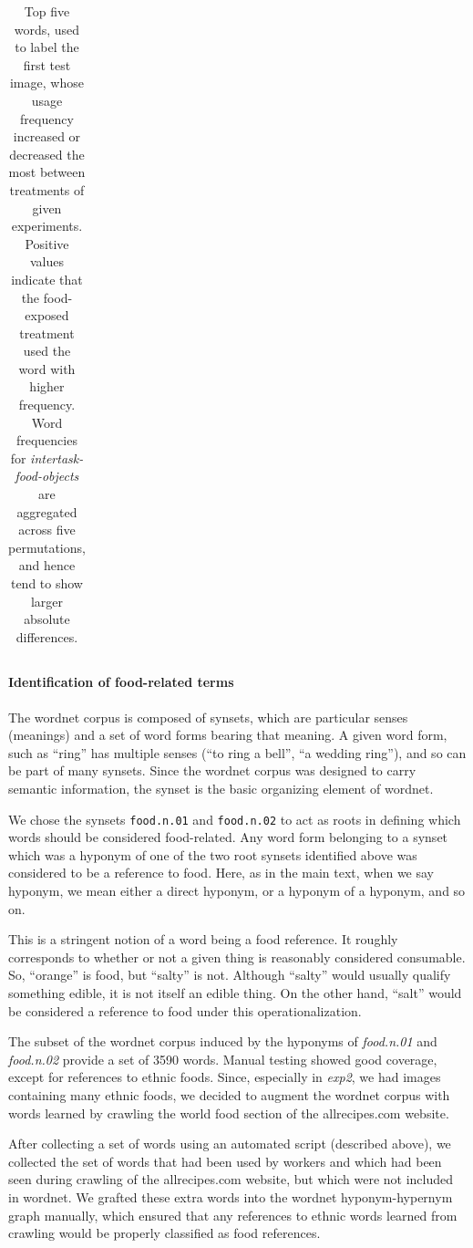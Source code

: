 \documentclass[12pt]{article}
\begin{document}
\begin{table}
\begin{tabular}{ c c c c c }
	\end{tabular}
	\caption{
		Top five words, used to label the first test image, whose usage frequency
		increased or decreased the most between treatments of given 
		experiments.  Positive values indicate that the food-exposed treatment
		used the word with higher frequency.  Word frequencies for 
		\textit{intertask-food-objects} are aggregated across five 
		permutations, and hence tend to show larger absolute differences.
	}
	\label{table:top-words}
\end{table}

\paragraph{Identification of food-related terms}
The wordnet corpus is composed of synsets, which are particular senses 
(meanings) and a set of word forms bearing that meaning. A given word form, 
such as ``ring'' has multiple senses (``to ring a bell'', ``a wedding ring''),
and so can be part of many synsets.  Since the wordnet corpus was designed
to carry semantic information, the synset is the basic organizing element
of wordnet.

We chose the synsets \texttt{food.n.01} and \texttt{food.n.02} to act as roots
in defining which words should be considered food-related.  Any word form
belonging to a synset which was a hyponym of one of the two root synsets
identified above was considered to be a reference to food.  Here, as in the
main text, when we say hyponym, we mean either a direct hyponym, or a hyponym
of a hyponym, and so on.

This is a stringent notion of a word being a food reference.  It roughly
corresponds to whether or not a given thing is reasonably considered 
consumable.  So, ``orange'' is food, but ``salty'' is not.  Although ``salty''
would usually qualify something edible, it is not itself an edible thing.
On the other hand, ``salt'' would be considered a reference to food under 
this operationalization.

The subset of the wordnet corpus induced by the hyponyms of \textit{food.n.01}
and \textit{food.n.02} provide a set of 3590 words.  Manual
testing showed good coverage, except for references to ethnic foods.  
Since, especially in \textit{exp2}, we had images containing many ethnic 
foods, we decided to augment the wordnet corpus with words learned by 
crawling the world food section of the allrecipes.com website.  

After collecting a set of words using an automated script 
(described above), we collected the set of words that had been used by
workers and which had been seen during crawling of the allrecipes.com website,
but which were not included in wordnet.  We grafted these extra words into
the wordnet hyponym-hypernym graph manually, which ensured that any references
to ethnic words learned from crawling would be properly classified as 
food references.
\end{document}
